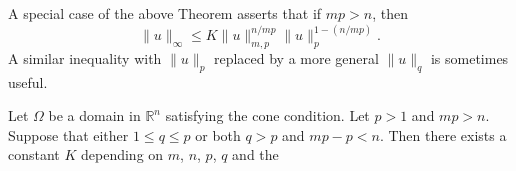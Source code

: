 A special case of the above Theorem asserts that if $mp>n$, then
\begin{equation}\label{eq:5.12}
  \|u\|_\infty \leq K \|u\|_{m,p}^{n/mp} \|u\|_p^{1-(n/mp)}.
\end{equation}
A similar inequality with $\|u\|_p$ replaced by a more general $\|u\|_q$
is sometimes useful.

\begin{theorem}
  Let $\Omega$ be a domain in $\mathbb{R}^n$ satisfying the cone condition.
  Let $p>1$ and $mp>n$. Suppose that either $1\leq q\leq p$ or both $q>p$
  and $mp-p<n$. Then there exists a constant $K$ depending on $m$, $n$, $p$,
  $q$ and the
\end{theorem}